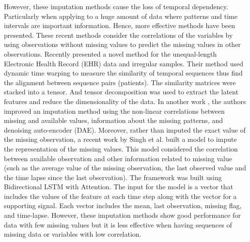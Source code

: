 \documentclass[conference]{IEEEtran}
\begin{document}
However, these imputation methods cause the loss of temporal dependency. Particularly when applying to a huge amount of data where patterns and time intervals are important information. Hence, more effective methods have been presented. These recent methods consider the correlations of the variables by using observations without missing values to predict the missing values in other observations. Recently \cite{zhang2021feature} presented a novel method for the unequal-length Electronic Health Record (EHR) data and irregular samples. Their method used dynamic time warping to measure the similarity of temporal sequences thus find the alignment between sequence pairs (patients). The similarity matrices were stacked into a tensor. And tensor decomposition was used to extract the latent features and reduce the dimensionality of the data. In another work \cite{ma2020midia}, the authors improved an imputation method using the non-linear correlations between missing and available values, information about the missing patterns, and denoising auto-encoder (DAE). Moreover, rather than imputed the exact value of the missing observation, a recent work by Singh et al. \cite{pratap2019multi} built a model to impute the representation of the missing values. This model considered the correlation between available observation and other information related to missing value (such as the average value of the missing observation, the last observed value and the time lapse since the last observation). The framework was built using Bidirectional LSTM with Attention. The input for the model is a vector that includes the values of the feature at each time step along with the vector for a supporting signal. Each vector includes the mean, last observation, missing flag, and time-lapse. However, these imputation methods show good performance for data with few missing values but it is less effective when having sequences of missing data or variables with low correlation. 
\end{document}
